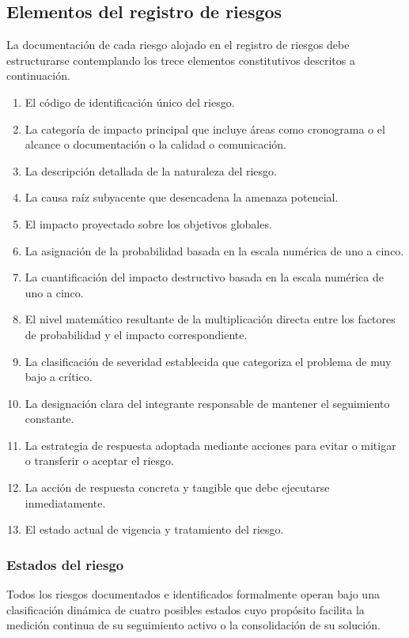 \documentclass[11pt,spanish]{article}
\begin{document}
\subsection{Elementos del registro de riesgos}

La documentación de cada riesgo alojado en el registro de riesgos debe estructurarse contemplando los trece elementos constitutivos descritos a continuación.

\begin{enumerate}
    \item El código de identificación único del riesgo.
    \item La categoría de impacto principal que incluye áreas como cronograma o el alcance o documentación o la calidad o comunicación.
    \item La descripción detallada de la naturaleza del riesgo.
    \item La causa raíz subyacente que desencadena la amenaza potencial.
    \item El impacto proyectado sobre los objetivos globales.
    \item La asignación de la probabilidad basada en la escala numérica de uno a cinco.
    \item La cuantificación del impacto destructivo basada en la escala numérica de uno a cinco.
    \item El nivel matemático resultante de la multiplicación directa entre los factores de probabilidad y el impacto correspondiente.
    \item La clasificación de severidad establecida que categoriza el problema de muy bajo a crítico.
    \item La designación clara del integrante responsable de mantener el seguimiento constante.
    \item La estrategia de respuesta adoptada mediante acciones para evitar o mitigar o transferir o aceptar el riesgo.
    \item La acción de respuesta concreta y tangible que debe ejecutarse inmediatamente.
    \item El estado actual de vigencia y tratamiento del riesgo.
\end{enumerate}

\subsubsection{Estados del riesgo}

Todos los riesgos documentados e identificados formalmente operan bajo una clasificación dinámica de cuatro posibles estados cuyo propósito facilita la medición continua de su seguimiento activo o la consolidación de su solución.
\end{document}
